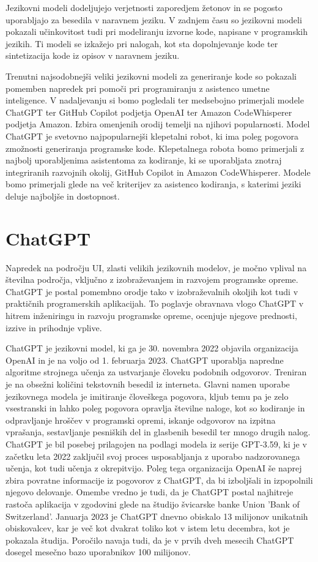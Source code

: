 \documentclass[a4paper,12pt,openright]{book}
\begin{document}
Jezikovni modeli dodeljujejo verjetnosti zaporedjem žetonov in se pogosto uporabljajo za besedila v naravnem jeziku. V zadnjem času so jezikovni modeli pokazali učinkovitost tudi pri modeliranju izvorne kode, napisane v programskih jezikih. Ti modeli se izkažejo pri nalogah, kot sta dopolnjevanje kode ter sintetizacija kode iz opisov v naravnem jeziku.


Trenutni najsodobnejši veliki jezikovni modeli za generiranje kode so pokazali pomemben napredek pri pomoči pri programiranju z asistenco umetne inteligence. V nadaljevanju si bomo pogledali ter medsebojno primerjali modele ChatGPT ter GitHub Copilot podjetja OpenAI ter Amazon CodeWhisperer podjetja Amazon.
\cite{KASNECI2023102274, vaswani2023attention}
Izbira omenjenih orodij temelji na njihovi popularnosti. Model ChatGPT je svetovno najpopularnejši klepetalni robot, ki ima poleg pogovora zmožnosti generiranja programske kode. Klepetalnega robota bomo primerjali z najbolj uporabljenima asistentoma za kodiranje, ki se uporabljata znotraj integriranih razvojnih okolij, GitHub Copilot in Amazon CodeWhisperer. Modele bomo primerjali glede na več kriterijev za asistenco kodiranja, s katerimi jeziki deluje najboljše in dostopnost.

\section{ChatGPT}
Napredek na področju UI, zlasti velikih jezikovnih modelov, je močno vplival na številna področja, vključno z izobraževanjem in razvojem programske opreme. ChatGPT je postal pomembno orodje tako v izobraževalnih okoljih kot tudi v praktičnih programerskih aplikacijah. To poglavje obravnava vlogo ChatGPT v hitrem inženiringu in razvoju programske opreme, ocenjuje njegove prednosti, izzive in prihodnje vplive.

ChatGPT je jezikovni model, ki ga je 30. novembra 2022 objavila organizacija OpenAI in je na voljo od 1. februarja 2023. \cite{openai_codex}
ChatGPT uporablja napredne algoritme strojnega učenja za ustvarjanje človeku podobnih odgovorov. Treniran je na obsežni količini tekstovnih besedil iz interneta. Glavni namen uporabe jezikovnega modela je imitiranje človeškega pogovora, kljub temu pa je zelo vsestranski in lahko poleg pogovora opravlja številne naloge, kot so kodiranje in odpravljanje hroščev v programski opremi, iskanje odgovorov na izpitna vprašanja, sestavljanje pesniških del in glasbenih besedil ter mnogo drugih nalog. ChatGPT je bil posebej prilagojen na podlagi modela iz serije GPT-3.59, ki je v začetku leta 2022 zaključil svoj proces usposabljanja z uporabo nadzorovanega učenja, kot tudi učenja z okrepitvijo. Poleg tega organizacija OpenAI še naprej zbira povratne informacije iz pogovorov z ChatGPT, da bi izboljšali in izpopolnili njegovo delovanje. Omembe vredno je tudi, da je ChatGPT postal najhitreje rastoča aplikacija v zgodovini glede na študijo švicarske banke Union 'Bank of Switzerland'. Januarja 2023 je ChatGPT dnevno obiskalo 13 milijonov unikatnih obiskovalcev, kar je več kot dvakrat toliko kot v istem letu decembra, kot je pokazala študija. Poročilo navaja tudi, da je v prvih dveh mesecih ChatGPT dosegel mesečno bazo uporabnikov 100 milijonov. \cite{yetistiren2023evaluating}
\end{document}

